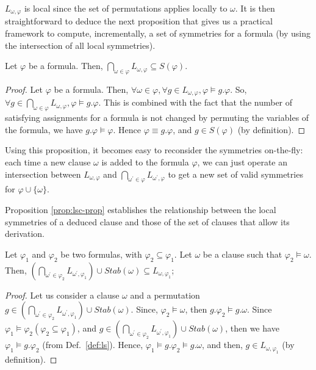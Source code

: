 $L_{\omega,\varphi}$ is local since the set of permutations applies locally to
$\omega$. It is then straightforward to deduce the next proposition that gives us a
practical framework to compute, incrementally, a set of symmetries for a
formula (by using the intersection of all local symmetries).

\begin{proposition}
	\label{prop:gls-prop}
	Let $\varphi$ be a formula. Then,  $\underset{\omega \in \varphi}{\bigcap}L_{\omega,\varphi} 
	\subseteq S(\varphi)$.
\end{proposition}

\begin{proof}
	Let $\varphi$ be a formula. Then, $\forall \omega \in \varphi, \forall g \in L_{\omega,\varphi}, \varphi \models g.\varphi $. So, $\forall g \in \underset{\omega \in \varphi}{\bigcap}L_{\omega,\varphi}, \varphi \models g.\varphi$. This is combined with the fact that the number of satisfying assignments for a formula is not changed by permuting the variables of the formula, we have $g.\varphi \models \varphi$. Hence $\varphi \equiv g.\varphi$, and $g \in S(\varphi)$ (by definition). 
\end{proof}

Using this proposition, it becomes easy to reconsider the symmetries
on-the-fly: each time a new clause $\omega$ is added to the formula $\varphi$,
we can just operate an intersection between $L_{\omega,\varphi}$ and
$\underset{\omega^\prime \in \varphi}{\bigcap}L_{\omega^\prime,\varphi}$ to get
a new set of valid symmetries for $\varphi \cup \{\omega\}$.

\medskip
Proposition \ref{prop:lsc-prop} establishes the relationship between the local symmetries of a deduced clause and those of the set of clauses that allow its derivation. 

\begin{proposition}
	\label{prop:lsc-prop}
	Let $\varphi_1$ and $\varphi_2$ be two formulas, with $\varphi_2 \subseteq \varphi_1$. 
	Let $\omega$ be a clause such that $\varphi_2 \models \omega$. Then, 
	$(\underset{\omega^\prime \in \varphi_2}{\bigcap}L_{\omega^\prime,\varphi_1})
	\cup Stab(\omega) \subseteq L_{\omega,\varphi_1}$;
\end{proposition} 


\begin{proof}
	Let us consider a clause $\omega$ and a permutation $g \in 
	(\underset{\omega^\prime \in \varphi_2}{\bigcap}L_{\omega^\prime,\varphi_1})
	\cup Stab(\omega)$.
	Since, $\varphi_2 \models \omega$, then  $g.\varphi_2 \models g.\omega$. Since $\varphi_1 \models \varphi_2 (\varphi_2 \subseteq \varphi_1)$, and 
	$g \in 
	(\underset{\omega^\prime \in \varphi_2}{\bigcap}L_{\omega^\prime,\varphi_1})
	\cup Stab(\omega)$, then we have $\varphi_1 \models g.\varphi_2$ (from Def.~\ref{def:ls}). Hence, $\varphi_1 \models g.\varphi_2 \models g.\omega$, and then, $g \in L_{\omega,\varphi_1}$ (by definition). 
\end{proof}
